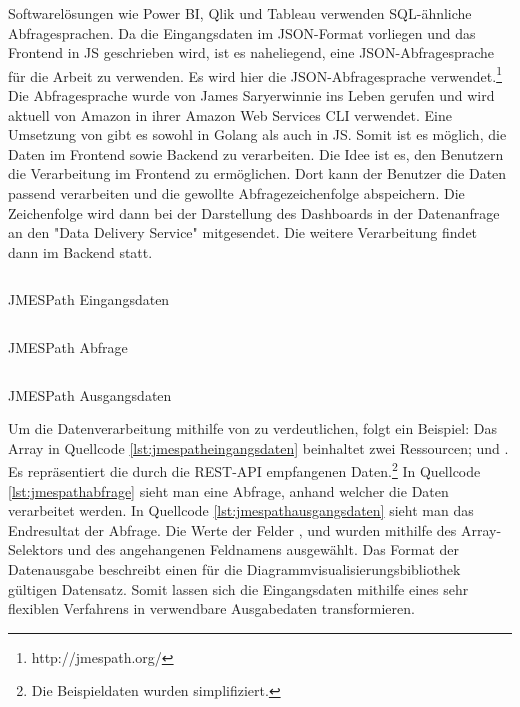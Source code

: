 Softwarelösungen wie Power BI, Qlik und Tableau verwenden SQL-ähnliche Abfragesprachen.
Da die Eingangsdaten im JSON-Format vorliegen und das Frontend in JS geschrieben wird,
ist es naheliegend, eine JSON-Abfragesprache für die Arbeit zu verwenden. Es wird hier die
JSON-Abfragesprache  verwendet.\footnote{http://jmespath.org/}
Die Abfragesprache wurde von James Saryerwinnie ins Leben gerufen und wird aktuell von
Amazon in ihrer Amazon Web Services CLI verwendet.\cite{AWSJMESPath} Eine Umsetzung von
 gibt es sowohl in Golang als auch in JS. Somit ist es möglich, die Daten im
Frontend sowie Backend zu verarbeiten. Die Idee ist es, den Benutzern die Verarbeitung
im Frontend zu ermöglichen. Dort kann der Benutzer die Daten passend verarbeiten und die
gewollte Abfragezeichenfolge abspeichern. Die Zeichenfolge wird dann bei der Darstellung des 
Dashboards in der Datenanfrage an den "Data Delivery Service" mitgesendet.
Die weitere Verarbeitung findet dann im Backend statt.

\begin{listing}[]
    \inputminted{jsx}{snippets/json/jmespath-example/jmespathinput.json}
    \caption{JMESPath Eingangsdaten}
    \label{lst:jmespatheingangsdaten}
\end{listing}

\begin{listing}[]
    \inputminted{jsx}{snippets/json/jmespath-example/jmespathquery.txt}
    \caption{JMESPath Abfrage}
    \label{lst:jmespathabfrage}
\end{listing}

\begin{listing}[]
    \inputminted{jsx}{snippets/json/jmespath-example/jmespathoutput.json}
    \caption{JMESPath Ausgangsdaten}
    \label{lst:jmespathausgangsdaten}
\end{listing}

Um die Datenverarbeitung mithilfe von  zu verdeutlichen, folgt ein
Beispiel: Das Array in Quellcode \ref{lst:jmespatheingangsdaten} beinhaltet zwei Ressourcen;
 und . Es repräsentiert die durch die REST-API empfangenen
Daten.\footnote{Die Beispieldaten wurden simplifiziert.} In Quellcode \ref{lst:jmespathabfrage}
sieht man eine Abfrage, anhand welcher die Daten verarbeitet werden. In Quellcode \ref{lst:jmespathausgangsdaten}
sieht man das Endresultat der Abfrage. Die Werte der Felder ,  und 
wurden mithilfe des Array-Selektors \code{[]} und des angehangenen Feldnamens ausgewählt.
Das Format der Datenausgabe beschreibt einen für die Diagrammvisualisierungsbibliothek
 gültigen Datensatz. Somit lassen sich die Eingangsdaten mithilfe eines sehr flexiblen Verfahrens
in verwendbare Ausgabedaten transformieren.

